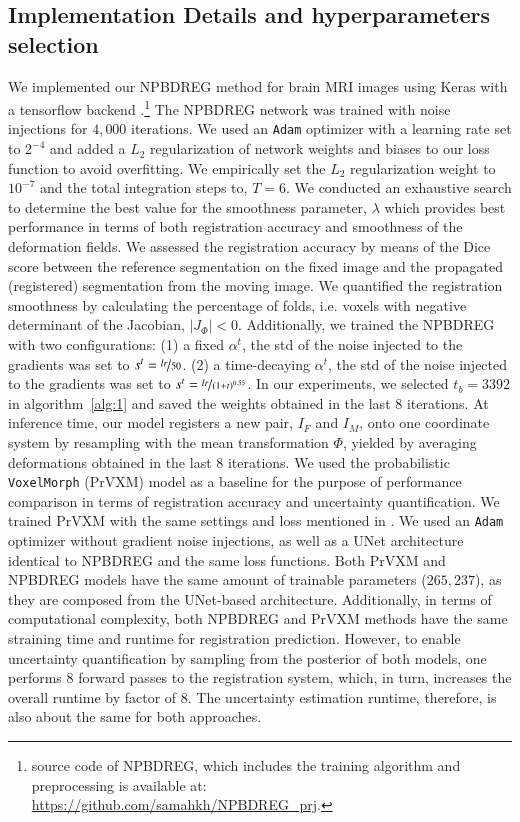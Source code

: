 \documentclass[preprint,authoryear]{elsarticle}
\begin{document}
\subsection {Implementation Details and hyperparameters selection}
We implemented our NPBDREG method for brain MRI images using Keras with a tensorflow backend \cite{abadi2016tensorflow}.\footnote{source code of NPBDREG, which includes the training algorithm and preprocessing is available at: \url{https://github.com/samahkh/NPBDREG_prj}. } 
The NPBDREG network was trained with noise injections for $4,000$ iterations. We used an \texttt{Adam} optimizer \cite{kingma2014adam} with  a learning rate set to $2^{-4}$ and added a $L_{2}$ regularization of network weights and biases to our loss function to avoid overfitting. We empirically set the $L_{2}$ regularization weight to $10^{-7}$ and the total integration steps to, $T=6$. 
We conducted an exhaustive search to determine the best value for the smoothness parameter, $\lambda$ which provides  best performance in terms of both registration accuracy and smoothness of the deformation fields. 
We assessed the registration accuracy by means of the Dice score \cite{dice1945measures} between the reference segmentation on the fixed image and the propagated (registered) segmentation from the moving image. We quantified the registration smoothness by calculating the percentage of folds, i.e. voxels with negative determinant of the Jacobian, $|J_\Phi|<0$. 
Additionally, we trained the NPBDREG with two configurations: (1) a fixed $\alpha^t$, the std of the noise injected to the gradients was set to $s^t=\nicefrac{lr}{50}$. (2) a time-decaying $\alpha^t$, the std of the noise injected to the gradients was set to $s^t=\nicefrac{lr}{(1+t)^{0.55}}$. In our experiments, we selected $t_b=3392$ in algorithm~\ref{alg:1} and saved the weights obtained in the last $8$ iterations.
 At inference time, our model registers a new pair, $I_F$ and $I_M$, onto one coordinate system by resampling with the mean transformation $\Phi$, yielded by averaging deformations obtained in the last $8$ iterations. 
 We used the probabilistic \texttt{VoxelMorph} (PrVXM) model \cite{dalca2018varreg} as a baseline for the purpose of performance comparison in terms of registration accuracy and uncertainty quantification. We trained PrVXM with the same settings and loss mentioned in \cite{dalca2018varreg}. We used an \texttt{Adam} optimizer without gradient noise injections, as well as a UNet architecture identical to NPBDREG and the same loss functions. Both PrVXM and NPBDREG models have the same amount of trainable parameters ($265,237$), as they are composed from the UNet-based architecture. Additionally, in terms of computational complexity, both NPBDREG and PrVXM methods have the same straining time and runtime for registration prediction. However, to enable uncertainty quantification by sampling from the posterior of both models, one performs $8$ forward passes to the registration system, which, in turn, increases the overall runtime by factor of $8$. The uncertainty estimation runtime, therefore, is also about the same for both approaches.
 
\end{document}
